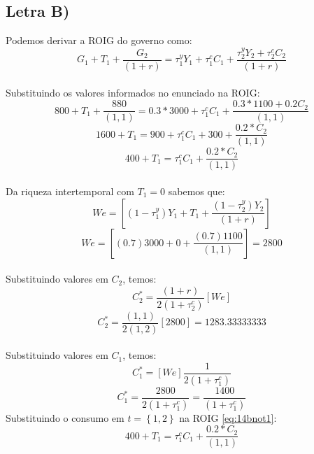 \documentclass{article}
\begin{document}
\subsection*{Letra B)}
Podemos derivar a ROIG do governo como:
\begin{equation}
    G_1+T_1+\frac{G_2}{(1+r)}=\tau_1^y Y_1 + \tau_1^c C_1 + \frac{\tau_2^y Y_2 + \tau_2^c C_2}{(1+r)}
\end{equation}
\\
Substituindo os valores informados no enunciado na ROIG:
\begin{equation}
    800+T_1+\frac{880}{(1,1)}= 0.3 * 3000 + \tau_1^c C_1 + \frac{0.3 *1100 + 0.2 C_2}{(1,1)}
\end{equation}
\begin{equation}
    1600+T_1= 900 + \tau_1^c C_1 + 300 +\frac{0.2*C_2}{(1,1)}
\end{equation}
\begin{equation}\label{eq:14bnot1}
    400 +T_1 = \tau_1^c C_1 + \frac{0.2*C_2}{(1,1)}
\end{equation}
\\
Da riqueza intertemporal com $T_1=0$ sabemos que:
\begin{equation}
    We=\left[(1-\tau_1^y)Y_1 + T_1 + \frac{(1-\tau_2^y)Y_2}{(1+r)}\right]
\end{equation}
\begin{equation}
    We=\left[(0.7)3000 + 0 + \frac{(0.7)1100}{(1,1)}\right] = 2800
\end{equation}
\\
Substituindo valores em $C_2$, temos:
\begin{equation}
    C_2^* = \frac{(1+r)}{2(1+\tau_2^c)}\left[We\right]
\end{equation}
\begin{equation}
    C_2^* = \frac{(1,1)}{2(1,2)}\left[2800\right]=1283.33333333
\end{equation}
\\
Substituindo valores em $C_1$, temos:
\begin{equation}
    C_1^* = \left[We\right]\frac{1}{2(1+\tau_1^c)}
\end{equation}
\begin{equation}
    C_1^* = \frac{2800}{2(1+\tau_1^c)}=\frac{1400}{(1+\tau_1^c)}
\end{equation}
Substituindo o consumo em $t=\left\{1,2\right\}$ na ROIG \eqref{eq:14bnot1}:
\begin{equation}
    400 +T_1 = \tau_1^c C_1 + \frac{0.2*C_2}{(1,1)}
\end{equation}
\end{document}
